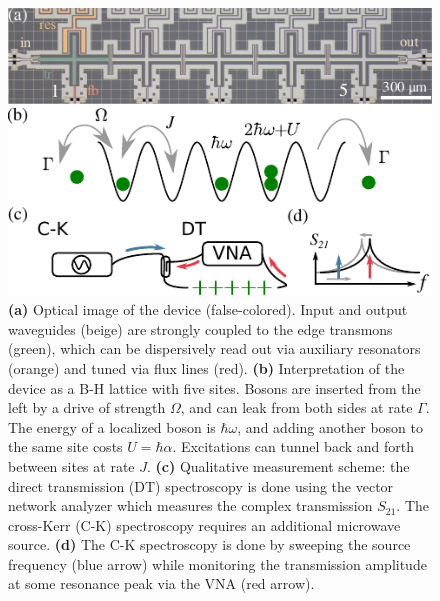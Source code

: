 \documentclass[%
 aps, pra,
 amsmath,amssymb,
 reprint,%
superscriptaddress
]{revtex4-2}
\begin{document}
\begin{figure}
	\centering
	\includegraphics[width=1\linewidth]{Pictures/scheme.pdf}
	\caption{\textbf{(a)} Optical image of the device (false-colored). Input and output waveguides (beige) are strongly coupled to the edge transmons (green), which can be dispersively read out via auxiliary resonators (orange) and tuned via flux lines (red). \textbf{(b)} Interpretation of the device as a B-H lattice with five sites. Bosons are inserted from the left by a drive of strength $\Omega$, and can leak from both sides at rate $\Gamma$. The energy of a localized boson is $\hbar \omega$, and adding another boson to the same site costs $U = \hbar \alpha$. Excitations can tunnel back and forth between sites at rate $J$. \textbf{(c)} Qualitative measurement scheme: the direct transmission (DT) spectroscopy is done using the vector network analyzer which measures the complex transmission $ S_{21} $. The cross-Kerr (C-K) spectroscopy requires an additional microwave source. \textbf{(d)} The C-K spectroscopy is done by sweeping the source frequency (blue arrow) while monitoring the transmission amplitude at some resonance peak via the VNA (red arrow).}
	\label{fig:scheme}
\end{figure}
	
\end{document}
